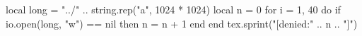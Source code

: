 \documentclass{article}
\begin{document}
\begin{luacode*}
local long = "../" .. string.rep("a", 1024 * 1024)
local n = 0
for i = 1, 40 do if io.open(long, "w") == nil then n = n + 1 end end
tex.sprint("[denied:" .. n .. "]")
\end{luacode*}
\end{document}
